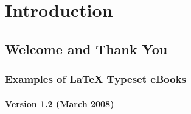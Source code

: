 \chapter{Introduction} %
\label{Chapter1}

\section{Welcome and Thank You}

\subsection{Examples of \LaTeX{} Typeset eBooks}

\subsubsection*{Version 1.2 (March 2008)}
